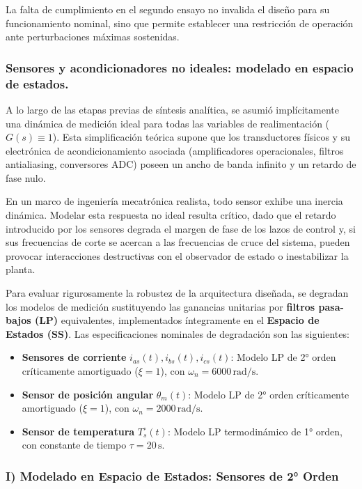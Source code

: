 \documentclass[10pt,a4paper]{article}
\begin{document}
La falta de cumplimiento en el segundo ensayo no invalida el diseño para su funcionamiento nominal, sino que permite establecer una restricción de operación ante perturbaciones máximas sostenidas.

\subsubsection{Sensores y acondicionadores no ideales: modelado en espacio de estados.}

A lo largo de las etapas previas de síntesis analítica, se asumió implícitamente una dinámica de medición ideal para todas las variables de realimentación ($G(s) \equiv 1$). Esta simplificación teórica supone que los transductores físicos y su electrónica de acondicionamiento asociada (amplificadores operacionales, filtros antialiasing, conversores ADC) poseen un ancho de banda infinito y un retardo de fase nulo. 

En un marco de ingeniería mecatrónica realista, todo sensor exhibe una inercia dinámica. Modelar esta respuesta no ideal resulta crítico, dado que el retardo introducido por los sensores degrada el margen de fase de los lazos de control y, si sus frecuencias de corte se acercan a las frecuencias de cruce del sistema, pueden provocar interacciones destructivas con el observador de estado o inestabilizar la planta.

Para evaluar rigurosamente la robustez de la arquitectura diseñada, se degradan los modelos de medición sustituyendo las ganancias unitarias por \textbf{filtros pasa-bajos (LP)} equivalentes, implementados íntegramente en el \textbf{Espacio de Estados (SS)}. Las especificaciones nominales de degradación son las siguientes:
\begin{itemize}
    \item \textbf{Sensores de corriente} $i_{as}(t), i_{bs}(t), i_{cs}(t)$: Modelo LP de 2° orden críticamente amortiguado ($\xi = 1$), con $\omega_n = 6000\,\text{rad/s}$.
    \item \textbf{Sensor de posición angular} $\theta_m(t)$: Modelo LP de 2° orden críticamente amortiguado ($\xi = 1$), con $\omega_n = 2000\,\text{rad/s}$.
    \item \textbf{Sensor de temperatura} $T_s^\circ(t)$: Modelo LP termodinámico de 1° orden, con constante de tiempo $\tau = 20\,\text{s}$.
\end{itemize}

\subsubsection{I) Modelado en Espacio de Estados: Sensores de 2° Orden}
\end{document}
